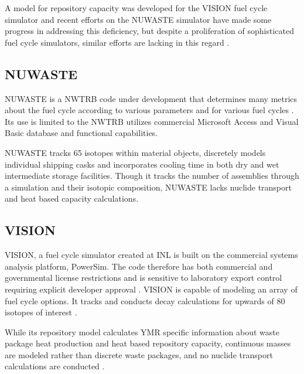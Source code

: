 A model for repository capacity was developed for the \gls{VISION} fuel cycle
simulator and recent efforts on the \gls{NUWASTE} simulator have made
some progress in addressing this deficiency, but despite a proliferation of
sophisticated fuel cycle simulators, similar efforts are lacking in this
regard \cite{yacout_visionverifiable_2006} \cite{radel_repository_2007} 
\cite{abkowitz_nuclear_2010}. 

\subsection{NUWASTE} 

\gls{NUWASTE} is a \acrlong{NWTRB} code under development 
that determines many metrics about the fuel cycle according to various
parameters and for various fuel cycles \cite{abkowitz_nuclear_2010}. Its use is 
limited to the \gls{NWTRB}  utilizes
commercial Microsoft Access and Visual Basic database and functional capabilities.  


\gls{NUWASTE} tracks 65 isotopes within 
material objects, discretely models individual shipping casks and incorporates 
cooling time in both dry and wet intermediate storage facilities. Though it 
tracks the number of assemblies through a simulation and their 
isotopic composition, \gls{NUWASTE} lacks nuclide transport and heat based 
capacity calculations. 

\subsection{VISION} 

\gls{VISION}, a fuel cycle simulator created at \gls{INL} is built on the 
commercial systems analysis platform, PowerSim. The code therefore has both 
commercial and governmental license restrictions and is sensitive to 
laboratory export control requiring explicit developer approval 
\cite{yacout_daness_2011,van_den_durpel_daness:_2006}. \gls{VISION} is 
capable of modeling an array of fuel cycle options. It tracks and conducts 
decay calculations for upwards of 80 isotopes of interest 
\cite{yacout_visionverifiable_2006, wilson_comparing_2011}.

While its repository model calculates \gls{YMR} specific information 
about waste package heat production and heat based repository capacity, 
continuous masses are modeled rather than discrete  waste packages, and no 
nuclide transport calculations are conducted  
\cite{radel_repository_2007} \cite{boucher_international_2010}.


